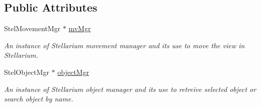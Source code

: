 \subsection*{Public Attributes}
\begin{DoxyCompactItemize}
\item 
Stel\+Movement\+Mgr $\ast$ \mbox{\hyperlink{class_autoscope_ab34124a1179a937ac061bb4fa3faa2de}{mv\+Mgr}}
\begin{DoxyCompactList}\small\item\em An instance of Stellarium movement manager and it\textquotesingle{}s use to move the view in Stellarium. \end{DoxyCompactList}\item 
Stel\+Object\+Mgr $\ast$ \mbox{\hyperlink{class_autoscope_aec2c452e45c0a7d045417a8656aa7c45}{object\+Mgr}}
\begin{DoxyCompactList}\small\item\em An instance of Stellarium object manager and it\textquotesingle{}s use to retreive selected object or search object by name. \end{DoxyCompactList}\end{DoxyCompactItemize}
